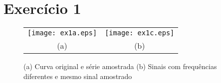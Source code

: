 \section*{Exercício 1}
\label{ex:1}

    \begin{figure}[H]
        \centering
        \begin{tabular}{cc}
        \texttt{[image: ex1a.eps]} & \texttt{[image: ex1c.eps]} \\ (a) & (b)
        \end{tabular}
        \caption{\label{fig:ex1ac} (a) Curva original e série amostrada (b) Sinais com frequências diferentes e mesmo sinal amostrado} 
    \end{figure}
    
